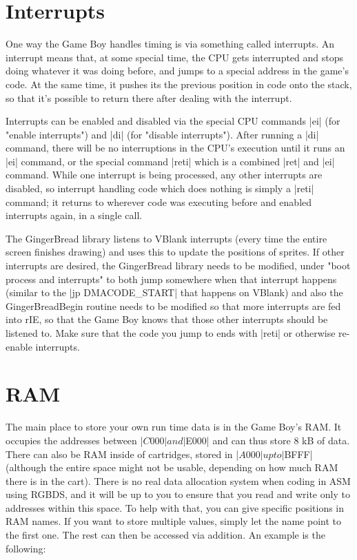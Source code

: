 \documentclass[11pt]{book}
\begin{document}
\section{Interrupts} 
\label{weinterruptthisprogramme}
One way the Game Boy handles timing is via something called interrupts. An interrupt means that, at some special time, the CPU gets interrupted and stops doing whatever it was doing before, and jumps to a special address in the game's code. At the same time, it pushes its the previous position in code onto the stack, so that it's possible to return there after dealing with the interrupt. 

Interrupts can be enabled and disabled via the special CPU commands |ei| (for "enable interrupts") and |di| (for "disable interrupts"). After running a |di| command, there will be no interruptions in the CPU's execution until it runs an |ei| command, or the special command |reti| which is a combined |ret| and |ei| command. While one interrupt is being processed, any other interrupts are disabled, so interrupt handling code which does nothing is simply a |reti| command; it returns to wherever code was executing before and enabled interrupts again, in a single call. 

The GingerBread library listens to VBlank interrupts (every time the entire screen finishes drawing) and uses this to update the positions of sprites. If other interrupts are desired, the GingerBread library needs to be modified, under "boot process and interrupts" to both jump somewhere when that interrupt happens (similar to the |jp DMACODE_START| that happens on VBlank) and also the GingerBreadBegin routine needs to be modified so that more interrupts are fed into rIE, so that the Game Boy knows that those other interrupts should be listened to. Make sure that the code you jump to ends with |reti| or otherwise re-enable interrupts.

\section{RAM}
\label{ram}
The main place to store your own run time data is in the Game Boy’s RAM. It occupies the addresses between |$C000| and |$E000| and can thus store 8 kB of data. There can also be RAM inside of cartridges, stored in |$A000| up to |$BFFF| (although the entire space might not be usable, depending on how much RAM there is in the cart). There is no real data allocation system when coding in ASM using RGBDS, and it will be up to you to ensure that you read and write only to addresses within this space. To help with that, you can give specific positions in RAM names. If you want to store multiple values, simply let the name point to the first one. The rest can then be accessed via addition. An example is the following:
\end{document}
